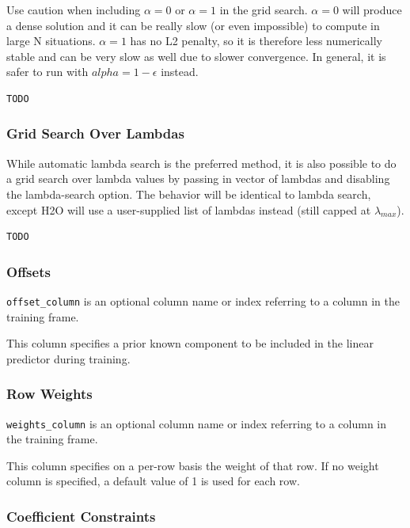 Use caution when including $\alpha=0$ or $\alpha=1$ in the grid search. $\alpha=0$ will produce a dense solution
and it can be really slow (or even impossible) to compute in large N situations. $\alpha=1$ has no L2 penalty, so
it is therefore less numerically stable and can be very slow as well due to slower convergence. In general, it is
safer to run with $alpha=1-\epsilon$ instead.

\bigskip
\waterExampleInR
\begin{lstlisting}[style=R]
TODO
\end{lstlisting}

\subsubsection{Grid Search Over Lambdas}

While automatic lambda search is the preferred method, it is also possible to do a grid search over lambda values
by passing in vector of lambdas and disabling the lambda-search option. The behavior will be identical to lambda
search, except H2O will use a user-supplied list of lambdas instead (still capped at $\lambda_{max}$).

\bigskip
\waterExampleInR
\begin{lstlisting}[style=R]
TODO
\end{lstlisting}

\subsubsection{Offsets}

\texttt{offset\_column} is an optional column name or index referring to a column in the training frame.

This column specifies a prior known component to be included in the linear predictor during training.

\subsubsection{Row Weights}

\texttt{weights\_column} is an optional column name or index referring to a column in the training frame.

This column specifies on a per-row basis the weight of that row.  If no weight column is specified, a default value
of 1 is used for each row.

\subsubsection{Coefficient Constraints}

